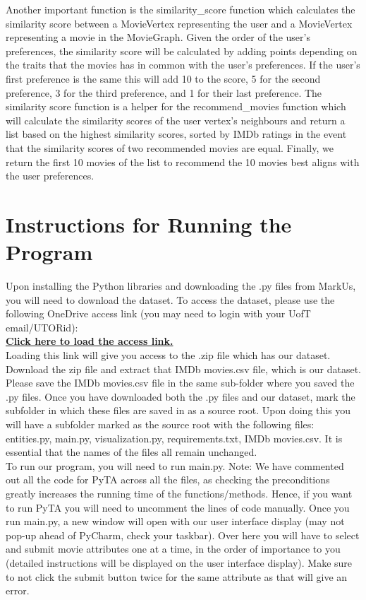 \documentclass[fontsize=11pt]{article}
\begin{document}
Another important function is the similarity\_score function which calculates the similarity score between a MovieVertex representing the user and a MovieVertex representing a movie in the MovieGraph. Given the order of the user's preferences, the similarity score will be calculated by adding points depending on the traits that the movies has in common with the user's preferences. If the user's first preference is the same this will add 10 to the score, 5 for the second preference, 3 for the third preference, and 1 for their last preference. The similarity score function is a helper for the recommend\_movies function which will calculate the similarity scores of the user vertex's neighbours and return a list based on the highest similarity scores, sorted by IMDb ratings in the event that the similarity scores of two recommended movies are equal. Finally, we return the first 10 movies of the list to recommend the 10 movies best aligns with the user preferences.


\section*{Instructions for Running the Program}
Upon installing the Python libraries and downloading the .py files from MarkUs, you will need to download the dataset. To access the dataset, please use the following OneDrive access link (you may need to login with your UofT email/UTORid):\\

\textbf{\href{https://utoronto-my.sharepoint.com/:u:/g/personal/nimit_bhanshali_mail_utoronto_ca/Edk0cr6Jly1EsIdkTWIlWQoBQxFpRfnXyeKznm8JWGNsZw?e=GXd3uP}{Click here to load the access link.}}\\

Loading this link will give you access to the .zip file which has our dataset. Download the zip file and extract that IMDb movies.csv file, which is our dataset. Please save the IMDb movies.csv file in the same sub-folder where you saved the .py files. Once you have downloaded both the .py files and our dataset, mark the subfolder in which these files are saved in as a source root. Upon doing this you will have a subfolder marked as the source root with the following files: entities.py, main.py, visualization.py, requirements.txt, IMDb movies.csv. It is essential that the names of the files all remain unchanged. \\

To run our program, you will need to run main.py. Note: We have commented out all the code for PyTA across all the files, as checking the preconditions greatly increases the running time of the functions/methods. Hence, if you want to run PyTA you will need to uncomment the lines of code manually. Once you run main.py, a new window will open with our user interface display (may not pop-up ahead of PyCharm, check your taskbar). Over here you will have to select and submit movie attributes one at a time, in the order of importance to you (detailed instructions will be displayed on the user interface display). Make sure to not click the submit button twice for the same attribute as that will give an error.\\
\end{document}
